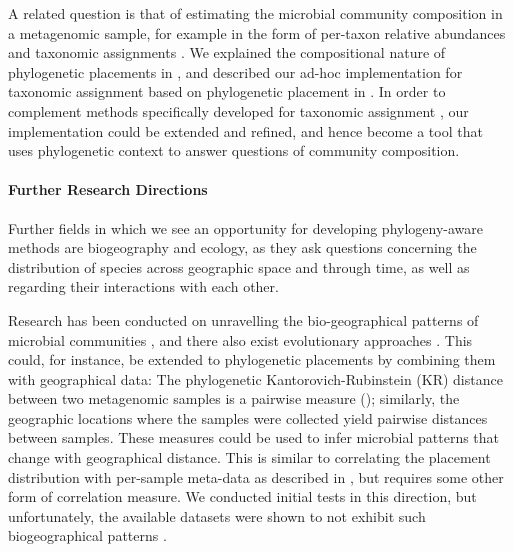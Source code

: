 
A related question is that of estimating the microbial community composition in a metagenomic sample,
for example in the form of per-taxon relative abundances and taxonomic assignments \cite{Lindgreen2016}.
We explained the compositional nature of phylogenetic placements in
,
and described our ad-hoc implementation for taxonomic assignment based on phylogenetic placement in %
.
In order to complement methods specifically developed for taxonomic assignment
\cite{Lindgreen2016,Sczyrba2017,Almeida2018},
our implementation could be extended and refined,
and hence become a tool that uses phylogenetic context to answer questions of community composition.


\paragraph{Further Research Directions}
\label{ch:ConclusionOutlook:sec:ResearchQuestions:par:FurtherResearch}

Further fields in which we see an opportunity for developing phylogeny-aware methods are biogeography and ecology,
as they ask questions concerning the distribution of species across geographic space and through time,
as well as regarding their interactions with each other.

Research has been conducted on unravelling the bio-geographical patterns of microbial communities
\cite{HughesMartiny2006}, and there also exist evolutionary approaches \cite{Cox2016}.
This could, for instance, be extended to phylogenetic placements by combining them with geographical data:
The phylogenetic Kantorovich-Rubinstein (KR) distance between two metagenomic samples is a pairwise measure
();
similarly, the geographic locations where the samples were collected yield pairwise distances between samples.
These measures could be used to infer microbial patterns that change with geographical distance.
This is similar to correlating the placement distribution with per-sample meta-data
as described in ,
but requires some other form of correlation measure.
We conducted initial tests in this direction, but unfortunately,
the available datasets were shown to not exhibit such biogeographical patterns \cite{Lentendu2018}.

